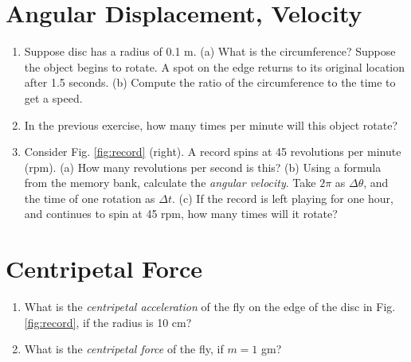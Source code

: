 \documentclass{article}
\begin{document}
\section{Angular Displacement, Velocity}

\begin{enumerate}
\item Suppose disc has a radius of 0.1 m. (a) What is the circumference?  Suppose the object begins to rotate.  A spot on the edge returns to its original location after 1.5 seconds.  (b) Compute the ratio of the circumference to the time to get a speed.  \\ \vspace{1cm}
\item In the previous exercise, how many times per minute will this object rotate? \\ \vspace{2cm}
\item Consider Fig. \ref{fig:record} (right).  A record spins at 45 revolutions per minute (rpm).  (a) How many revolutions per second is this? (b) Using a formula from the memory bank, calculate the \textit{angular velocity}.  Take $2\pi$ as $\Delta \theta$, and the time of one rotation as $\Delta t$.  (c) If the record is left playing for one hour, and continues to spin at 45 rpm, how many times will it rotate? \\ \vspace{2cm}
\end{enumerate}

\section{Centripetal Force}

\begin{enumerate}
\item What is the \textit{centripetal acceleration} of the fly on the edge of the disc in Fig. \ref{fig:record}, if the radius is 10 cm? \\ \vspace{2cm}
\item What is the \textit{centripetal force} of the fly, if $m=1$ gm?
\end{enumerate}
\end{document}
